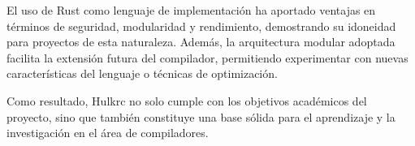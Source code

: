 \documentclass{article}
\begin{document}
El uso de Rust como lenguaje de implementación ha aportado ventajas en términos de seguridad, modularidad y rendimiento, demostrando su idoneidad para proyectos de esta naturaleza. Además, la arquitectura modular adoptada facilita la extensión futura del compilador, permitiendo experimentar con nuevas características del lenguaje o técnicas de optimización.

Como resultado, Hulkrc no solo cumple con los objetivos académicos del proyecto, sino que también constituye una base sólida para el aprendizaje y la investigación en el área de compiladores.
\end{document}
